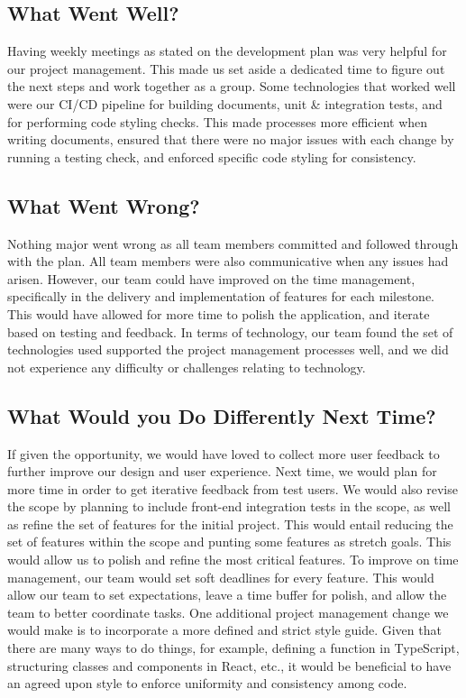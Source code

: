 \documentclass{article}
\begin{document}
\subsection{What Went Well?}
Having weekly meetings as stated on the development plan was very helpful for our project
management. This made us set aside a dedicated time to figure out the next steps and work together
as a group. Some technologies that worked well were our CI/CD pipeline for building documents, unit
\& integration tests, and for performing code styling checks. This made processes more efficient
when writing documents, ensured that there were no major issues with each change by running a
testing check, and enforced specific code styling for consistency.

\subsection{What Went Wrong?}
Nothing major went wrong as all team members committed and followed through with the plan. All team
members were also communicative when any issues had arisen. However, our team could have improved
on the time management, specifically in the delivery and implementation of features for each
milestone. This would have allowed for more time to polish the application, and iterate based on
testing and feedback. In terms of technology, our team found the set of technologies used supported
the project management processes well, and we did not experience any difficulty or challenges
relating to technology.

\subsection{What Would you Do Differently Next Time?}
If given the opportunity, we would have loved to collect more user feedback to further improve our
design and user experience. Next time, we would plan for more time in order to get iterative
feedback from test users. We would also revise the scope by planning to include front-end
integration tests in the scope, as well as refine the set of features for the initial project. This
would entail reducing the set of features within the scope and punting some features as stretch
goals. This would allow us to polish and refine the most critical features. To improve on time
management, our team would set soft deadlines for every feature. This would allow our team to set
expectations, leave a time buffer for polish, and allow the team to better coordinate tasks. One
additional project management change we would make is to incorporate a more defined and strict
style guide. Given that there are many ways to do things, for example, defining a function in
TypeScript, structuring classes and components in React, etc., it would be beneficial to have an
agreed upon style to enforce uniformity and consistency among code.
\end{document}

